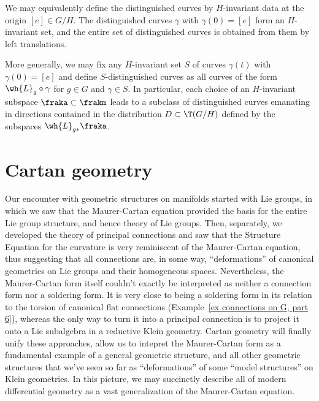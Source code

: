 \begin{rem}
    We may equivalently define the distinguished curves by $H$-invariant data at the origin $[e]\in G\slash H$. The distinguished curves $\gamma$ with $\gamma(0)=[e]$ form an $H$-invariant set, and the entire set of distinguished curves is obtained from them by left translations.

    More generally, we may fix any $H$-invariant set $S$ of curves $\gamma(t)$ with $\gamma(0)=[e]$ and define $S$-distinguished curves as all curves of the form $\wh{L}_g\circ\gamma$ for $g\in G$ and $\gamma\in S$. In particular, each choice of an $H$-invariant subspace $\fraka\subset\frakm$ leads to a subclass of distinguished curves emanating in directions contained in the distribution $D\subset \T(G\slash H)$ defined by the subspaces $\wh{L}_{g\ast}\fraka$.
\end{rem}











\section{Cartan geometry}


Our encounter with geometric structures on manifolds started with Lie groups, in which we saw that the Maurer-Cartan equation provided the basis for the entire Lie group structure, and hence theory of Lie groups. Then, separately, we developed the theory of principal connections and saw that the Structure Equation for the curvature is very reminiscent of the Maurer-Cartan equation, thus suggesting that all connections are, in some way, ``deformations'' of canonical geometries on Lie groups and their homogeneous spaces. Nevertheless, the Maurer-Cartan form itself couldn't exactly be interpreted as neither a connection form nor a soldering form. It is very close to being a soldering form in its relation to the torsion of canonical flat connections (Example~\ref{ex connections on G, part 6}), whereas the only way to turn it into a principal connection is to project it onto a Lie subalgebra in a reductive Klein geometry. Cartan geometry will finally unify these approaches, allow us to intepret the Maurer-Cartan form as a fundamental example of a general geometric structure, and all other geometric structures that we've seen so far as ``deformations'' of some ``model structures'' on Klein geometries. In this picture, we may succinctly describe all of modern differential geometry as a vast generalization of the Maurer-Cartan equation.


